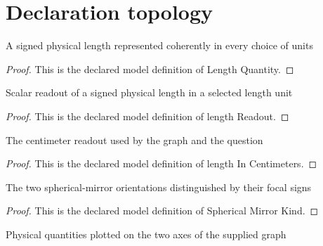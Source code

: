 \section{Declaration topology}
\begin{definition}
  \label{def:physics:phyx-mini-0160:phyxminiproblems-problemphyxmini0160-lengthquantity}
  A signed physical length represented coherently in every choice of units
\end{definition}
\begin{proof}
  This is the declared model definition of Length Quantity.
\end{proof}
\begin{definition}
  \label{def:physics:phyx-mini-0160:phyxminiproblems-problemphyxmini0160-lengthreadout}
  Scalar readout of a signed physical length in a selected length unit
\end{definition}
\begin{proof}
  This is the declared model definition of length Readout.
\end{proof}
\begin{definition}
  \label{def:physics:phyx-mini-0160:phyxminiproblems-problemphyxmini0160-lengthincentimeters}
  The centimeter readout used by the graph and the question
\end{definition}
\begin{proof}
  This is the declared model definition of length In Centimeters.
\end{proof}
\begin{definition}
  \label{def:physics:phyx-mini-0160:phyxminiproblems-problemphyxmini0160-sphericalmirrorkind}
  The two spherical-mirror orientations distinguished by their focal signs
\end{definition}
\begin{proof}
  This is the declared model definition of Spherical Mirror Kind.
\end{proof}
\begin{definition}
  \label{def:physics:phyx-mini-0160:phyxminiproblems-problemphyxmini0160-graphvariable}
  Physical quantities plotted on the two axes of the supplied graph
\end{definition}
